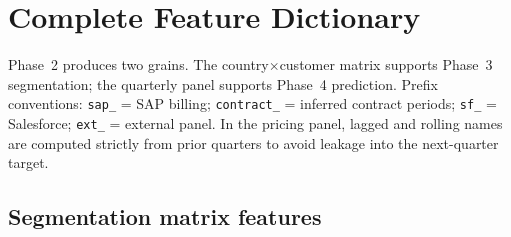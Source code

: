 \documentclass{article}
\begin{document}

\newpage

\section{Complete Feature Dictionary}
\label{app:feature_dictionary}

Phase~2 produces two grains. The country$\times$customer matrix supports Phase~3 segmentation; the quarterly panel supports Phase~4 prediction. Prefix conventions: \texttt{sap\_} = SAP billing; \texttt{contract\_} = inferred contract periods; \texttt{sf\_} = Salesforce; \texttt{ext\_} = external panel. In the pricing panel, lagged and rolling names are computed strictly from prior quarters to avoid leakage into the next-quarter target.

\subsection{Segmentation matrix features}
\end{document}
